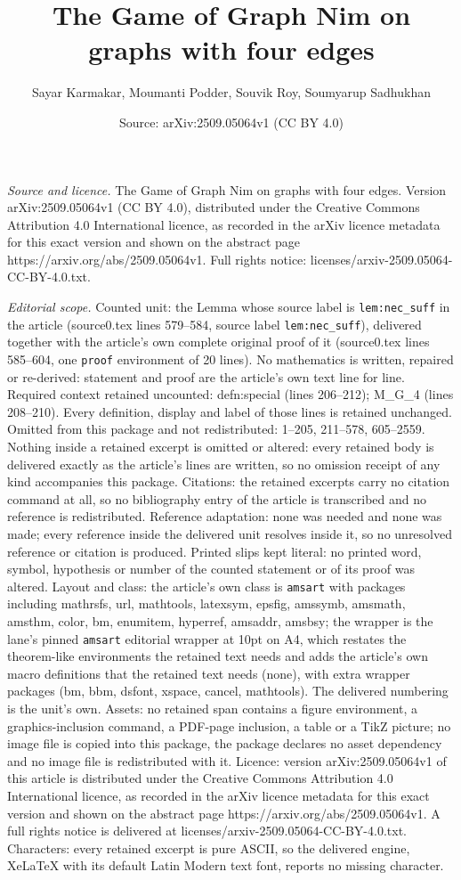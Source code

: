 \documentclass[10pt,a4paper]{amsart}
\title[The Game of Graph Nim on graphs with four edges]{The Game of Graph Nim on graphs with four edges}
\author{Sayar Karmakar, Moumanti Podder, Souvik Roy, Soumyarup Sadhukhan}
\date{Source: arXiv:2509.05064v1 (CC BY 4.0)}
\begin{document}
\maketitle

\noindent\emph{Source and licence.} The Game of Graph Nim on graphs with four edges. Version arXiv:2509.05064v1 (CC BY 4.0), distributed under the Creative Commons Attribution 4.0 International licence, as recorded in the arXiv licence metadata for this exact version and shown on the abstract page https://arxiv.org/abs/2509.05064v1. Full rights notice: licenses/arxiv-2509.05064-CC-BY-4.0.txt.\par\smallskip

\noindent\textit{Editorial scope.} Counted unit: the Lemma whose source label is \texttt{lem:nec\_suff} in the article (source0.tex lines 579--584, source label \texttt{lem:nec\_suff}), delivered together with the article's own complete original proof of it (source0.tex lines 585--604, one \texttt{proof} environment of 20 lines). No mathematics is written, repaired or re-derived: statement and proof are the article's own text line for line. Required context retained uncounted: defn:special (lines 206--212); M\_G\_{4 (lines 208--210). Every definition, display and label of those lines is retained unchanged. Omitted from this package and not redistributed: 1--205, 211--578, 605--2559. Nothing inside a retained excerpt is omitted or altered: every retained body is delivered exactly as the article's lines are written, so no omission receipt of any kind accompanies this package. Citations: the retained excerpts carry no citation command at all, so no bibliography entry of the article is transcribed and no reference is redistributed. Reference adaptation: none was needed and none was made; every reference inside the delivered unit resolves inside it, so no unresolved reference or citation is produced. Printed slips kept literal: no printed word, symbol, hypothesis or number of the counted statement or of its proof was altered. Layout and class: the article's own class is \texttt{amsart} with packages including mathrsfs, url, mathtools, latexsym, epsfig, amssymb, amsmath, amsthm, color, bm, enumitem, hyperref, amsaddr, amsbsy; the wrapper is the lane's pinned \texttt{amsart} editorial wrapper at 10pt on A4, which restates the theorem-like environments the retained text needs and adds the article's own macro definitions that the retained text needs (none), with extra wrapper packages (bm, bbm, dsfont, xspace, cancel, mathtools). The delivered numbering is the unit's own. Assets: no retained span contains a figure environment, a graphics-inclusion command, a PDF-page inclusion, a table or a TikZ picture; no image file is copied into this package, the package declares no asset dependency and no image file is redistributed with it. Licence: version arXiv:2509.05064v1 of this article is distributed under the Creative Commons Attribution 4.0 International licence, as recorded in the arXiv licence metadata for this exact version and shown on the abstract page https://arxiv.org/abs/2509.05064v1. A full rights notice is delivered at licenses/arxiv-2509.05064-CC-BY-4.0.txt. Characters: every retained excerpt is pure ASCII, so the delivered engine, XeLaTeX with its default Latin Modern text font, reports no missing character.
}
\end{document}
